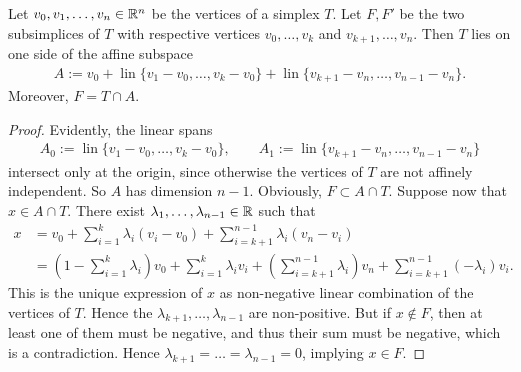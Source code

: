 \documentclass[10pt,letterpaper]{article}
\begin{document}
\begin{lemma}\label{lemma:oppositesubsimplex}
    Let $v_0, v_1, \dots, v_n \in {\mathbb R}^n$ be the vertices of a simplex $T$.
    Let $F, F'$ be the two subsimplices of $T$ with respective vertices $v_0,\dots,v_k$ and $v_{k+1},\dots,v_n$.
    Then $T$ lies on one side of the affine subspace
    \begin{gather*}
        A 
        := 
        v_0 
        + 
        \operatorname{lin}\{ v_1 - v_0, \dots, v_k - v_0 \} 
        +  
        \operatorname{lin}\{ v_{k+1} - v_n, \dots, v_{n-1} - v_n \}.
    \end{gather*}
    Moreover, $F = T \cap A$.
\end{lemma}
\begin{proof}
    Evidently, the linear spans 
    \begin{gather*}
        A_{0} := \operatorname{lin}\{ v_1 - v_0, \dots, v_k - v_0 \},
        \qquad 
        A_{1} := \operatorname{lin}\{ v_{k+1} - v_n, \dots, v_{n-1} - v_n \}
    \end{gather*}
    intersect only at the origin, since otherwise the vertices of $T$ are not affinely independent. 
    So $A$ has dimension $n-1$. 
    Obviously, $F \subset A \cap T$. 
    Suppose now that $x \in A \cap T$.
    There exist $\lambda_1,\dots,\lambda_{n-1} \in {\mathbb R}$ such that 
    \begin{align*}
        x &= 
        v_0 + \sum_{i=1}^{k} \lambda_{i} ( v_i - v_0 ) + \sum_{i=k+1}^{n-1} \lambda_{i} ( v_n - v_i )
        \\&
        = 
        \left( 1 - \sum_{i=1}^{k} \lambda_{i} \right) v_0 
        + 
        \sum_{i=1  }^{k  } \lambda_{i} v_i 
        + 
        \left( \sum_{i=k+1}^{n-1} \lambda_{i} \right) v_n
        + 
        \sum_{i=k+1}^{n-1} (-\lambda_{i}) v_i 
        .
    \end{align*}
    This is the unique expression of $x$ as non-negative linear combination of the vertices of $T$.
    Hence the $\lambda_{k+1}, \dots, \lambda_{n-1}$ are non-positive.
    But if $x \notin F$, then at least one of them must be negative,
    and thus their sum must be negative, which is a contradiction. 
    Hence $\lambda_{k+1} = \dots = \lambda_{n-1} = 0$, implying $x \in F$.
\end{proof}
\end{document}
